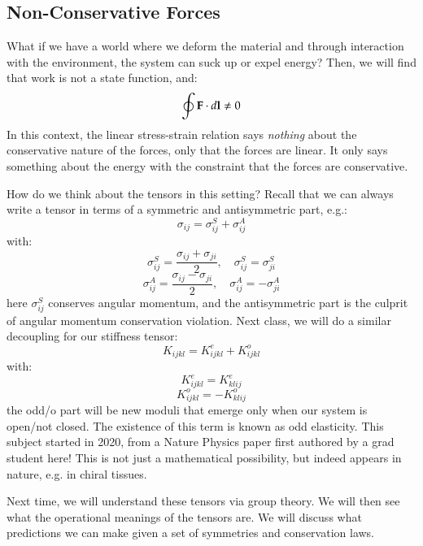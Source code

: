 \subsection{Non-Conservative Forces}
What if we have a world where we deform the material and through interaction with the environment, the system can suck up or expel energy? Then, we will find that work is not a state function, and:
\begin{equation}
    \oint \mathbf{F} \cdot d\mathbf{l}\neq 0 
\end{equation}
In this context, the linear stress-strain relation says \emph{nothing} about the conservative nature of the forces, only that the forces are linear. It only says something about the energy with the constraint that the forces are conservative.

How do we think about the tensors in this setting? Recall that we can always write a tensor in terms of a symmetric and antisymmetric part, e.g.:
\begin{equation}
    \sigma_{ij} = \sigma_{ij}^S + \sigma_{ij}^A
\end{equation}
with:
\begin{equation}
    \sigma_{ij}^S = \frac{\sigma_{ij} + \sigma_{ji}}{2}, \quad \sigma_{ij}^S = \sigma_{ji}^S
\end{equation}
\begin{equation}
    \sigma_{ij}^A = \frac{\sigma_{ij} - \sigma_{ji}}{2}, \quad \sigma_{ij}^A = -\sigma_{ji}^A
\end{equation}
here $\sigma_{ij}^S$ conserves angular momentum, and the antisymmetric part is the culprit of angular momentum conservation violation. Next class, we will do a similar decoupling for our stiffness tensor:
\begin{equation}
    K_{ijkl} = K_{ijkl}^e + K_{ijkl}^o
\end{equation}
with:
\begin{equation}
    K_{ijkl}^e = K_{klij}^e
\end{equation}
\begin{equation}
    K_{ijkl}^o = -K_{klij}^o
\end{equation}
the odd/o part will be new moduli that emerge only when our system is open/not closed. The existence of this term is known as odd elasticity. This subject started in 2020, from a Nature Physics paper first authored by a grad student here! This is not just a mathematical possibility, but indeed appears in nature, e.g. in chiral tissues.

Next time, we will understand these tensors via group theory. We will then see what the operational meanings of the tensors are. We will discuss what predictions we can make given a set of symmetries and conservation laws. 